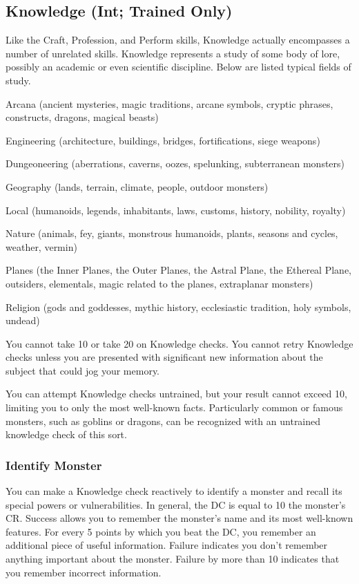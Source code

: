 \subsection{Knowledge (Int; Trained Only)}\label{Knowledge (Int; Trained Only)}
Like the Craft, Profession, and Perform skills, Knowledge actually encompasses a number of unrelated skills. Knowledge represents a study of some body of lore, possibly an academic or even scientific discipline. Below are listed typical fields of study.
\begin{itemize*}
\item Arcana (ancient mysteries, magic traditions, arcane symbols,
cryptic phrases, constructs, dragons, magical beasts)
\item Engineering (architecture, buildings, bridges, fortifications, siege weapons)
\item Dungeoneering (aberrations, caverns, oozes, spelunking, subterranean monsters)
\item Geography (lands, terrain, climate, people, outdoor monsters)
\item Local (humanoids, legends, inhabitants, laws, customs, history, nobility, royalty)
\item Nature (animals, fey, giants, monstrous humanoids, plants, seasons and cycles, weather, vermin)
\item Planes (the Inner Planes, the Outer Planes, the Astral Plane,
the Ethereal Plane, outsiders, elementals, magic related to the planes, extraplanar monsters)
\item Religion (gods and goddesses, mythic history, ecclesiastic tradition, holy symbols, undead)
\end{itemize*}

You cannot take 10 or take 20 on Knowledge checks. You cannot retry Knowledge checks unless you are presented with significant new information about the subject that could jog your memory.

You can attempt Knowledge checks untrained, but your result cannot exceed 10, limiting you to only the most well-known facts. Particularly common or famous monsters, such as goblins or dragons, can be recognized with an untrained knowledge check of this sort. 

\subsubsection{Identify Monster}
You can make a Knowledge check reactively to identify a monster and recall its special powers or vulnerabilities. In general, the DC is equal to 10 \add the monster's CR. Success allows you to remember the monster's name and its most well-known features. For every 5 points by which you beat the DC, you remember an additional piece of useful information. Failure indicates you don't remember anything important about the monster. Failure by more than 10 indicates that you remember incorrect information.

